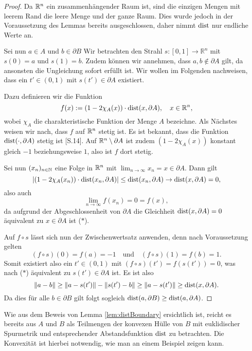 \begin{proof}
  Da $\mathbb{R}^n$ ein zusammenhängender Raum ist, sind die einzigen Mengen mit leerem Rand die leere Menge und der ganze Raum.
  Dies wurde jedoch in der Voraussetzung des Lemmas bereits ausgeschlossen, daher nimmt $\operatorname{dist}$ nur endliche Werte an.

  Sei nun $a \in A$ und $b \in \partial B$
  Wir betrachten den Strahl $s \colon [0,1] \to \mathbb{R}^n$ mit $s(0) = a$ und $s(1) = b$.
  Zudem können wir annehmen, dass $a,b \not\in \partial A$ gilt, da ansonsten die Ungleichung sofort erfüllt ist.
  Wir wollen im Folgenden nachweisen, dass ein $t' \in (0,1)$ mit $s(t') \in \partial A$ existiert.

  Dazu definieren wir die Funktion
  $$
  f(x) := (1 - 2\chi_A(x)) \cdot \operatorname{dist}(x, \partial A), \quad x \in \mathbb{R}^n,
  $$
  wobei $\chi_A$ die charakteristische Funktion der Menge $A$ bezeichne.
  Als Nächstes weisen wir nach, dass $f$ auf $\mathbb{R}^n$ stetig ist.
  Es ist bekannt, dass die Funktion $\operatorname{dist}(\cdot, \partial A)$ stetig ist \cite{koenigsberger2004ana2}[S.14].
  Auf $\mathbb{R}^n \setminus \partial A$ ist zudem $(1 - 2\chi_A(x))$ konstant gleich $-1$ beziehungsweise $1$, also ist $f$ dort stetig.

  Sei nun $(x_n)_{n \in \mathbb{N}}$ eine Folge in $\mathbb{R}^n$ mit $\lim_{n \to \infty} x_n = x \in \partial A$.
  Dann gilt
  $$
  |(1 - 2\chi_A(x_n)) \cdot \operatorname{dist}(x_n, \partial A)| 
  \leq \operatorname{dist}(x_n,\partial A)
  \to \operatorname{dist}(x,\partial A) 
  = 0,
  $$
  also auch 
  $$
  \lim_{n \to \infty} f(x_n) = 0 = f(x),
  $$
  da aufgrund der Abgeschlossenheit von $\partial A$ die Gleichheit $\operatorname{dist}(x,\partial A) = 0$ äquivalent zu $x \in \partial A$ ist ($\ast$).

  Auf $f \circ s$ lässt sich nun der Zwischenwertsatz anwenden, denn nach Voraussetzung gelten
  $$
  (f \circ s)(0) = f(a) = -1 \quad\text{und}\quad (f \circ s)(1) = f(b) = 1.
  $$
  Somit existiert also ein $t' \in (0,1)$ mit $(f\circ s)(t') = f(s(t')) = 0$, was nach ($\ast$) äquivalent zu $s(t') \in \partial A$ ist.
  Es ist also
  $$
  \lVert a - b \rVert \geq \lVert a - s(t') \rVert - \lVert s(t') - b \rVert \geq \lVert a - s(t') \rVert \geq \operatorname{dist}(x,\partial A).
  $$
  Da dies für alle $b \in \partial B$ gilt folgt sogleich $ \operatorname{dist}(a, \partial B) \geq \operatorname{dist}(a, \partial A)$.
\end{proof}

\begin{bem}
  Wie aus dem Beweis von Lemma \ref{lem:distBoundary} ersichtlich ist, reicht es bereits aus $A$ und $B$ als Teilmengen der konvexen Hülle von $B$ mit euklidischer Spurmetrik und entsprechender Abstandsfunktion $\operatorname{dist}$ zu betrachten.
  Die Konvexität ist hierbei notwendig, wie man an einem Beispiel zeigen kann.
\end{bem}

